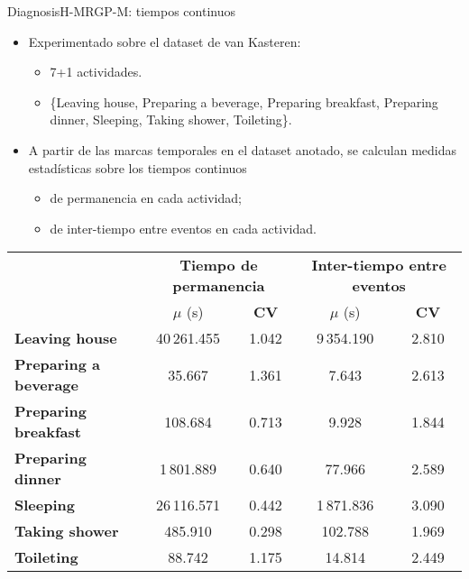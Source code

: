 \documentclass[9pt, handout]{beamer}
\begin{document}
      \begin{frame}{Diagnosis}{H-MRGP-M: tiempos continuos}
        \begin{itemize}
          \item Experimentado sobre el dataset de van Kasteren:
          \begin{itemize}
            \item 7+1 actividades.
            \item \{Leaving house, Preparing a beverage, Preparing breakfast, Preparing dinner, Sleeping, Taking shower, Toileting\}.
          \end{itemize}
          \item A partir de las marcas temporales en el dataset anotado, se calculan medidas estadísticas sobre los tiempos continuos
          \begin{itemize}
            \item de permanencia en cada actividad;
            \item de inter-tiempo entre eventos en cada actividad.
          \end{itemize}
        \end{itemize}
        
    		\begin{table}[h!]
    			\centering
    			\small
    			\setlength{\tabcolsep}{5pt}
    			\def\arraystretch{0.75}
    			\begin{tabular}{| l | c | c || c | c |}
    				\hline
    				& \multicolumn{2}{|c||}{\bf Tiempo de permanencia}& \multicolumn{2}{|c|}{\bf Inter-tiempo entre eventos}\\
    				\cline{2-5}
    				& $\mu$ (s) & {\bf CV} & $\mu$ (s) & {\bf CV}\\
    				\hline
    				{\bf Leaving house} & 40\,261.455 & 1.042 & 9\,354.190 & 2.810 \\ \hline
    				{\bf Preparing a beverage} &  35.667 & 1.361 & 7.643 & 2.613\\ \hline
    				{\bf Preparing breakfast} &  108.684 & 0.713 & 9.928 & 1.844\\ \hline
    				{\bf Preparing dinner} &  1\,801.889 & 0.640 & 77.966 & 2.589\\ \hline
    				{\bf Sleeping} &  26\,116.571 & 0.442 & 1\,871.836 & 3.090\\ \hline
    				{\bf Taking shower} &  485.910 & 0.298 & 102.788 & 1.969\\ \hline
    				{\bf Toileting} &  88.742 & 1.175 & 14.814 & 2.449\\ 
    				\hline
      		\end{tabular}
    		\end{table}
      \end{frame}
      
\end{document}
